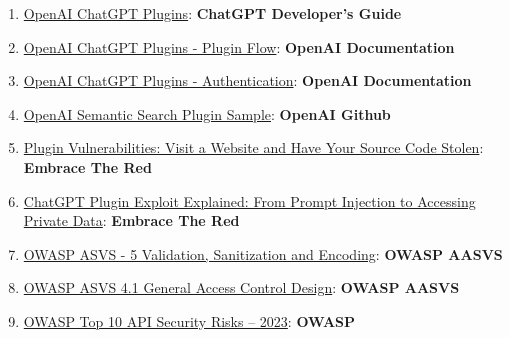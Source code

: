 \documentclass[
]{article}
\providecommand{\tightlist}{%
  \setlength{\itemsep}{0pt}\setlength{\parskip}{0pt}}
\begin{document}
\begin{enumerate}
\def\labelenumi{\arabic{enumi}.}
\tightlist
\item
  \href{https://platform.openai.com/docs/plugins/introduction}{OpenAI
  ChatGPT Plugins}: \textbf{ChatGPT Developer's Guide}
\item
  \href{https://platform.openai.com/docs/plugins/introduction/plugin-flow}{OpenAI
  ChatGPT Plugins - Plugin Flow}: \textbf{OpenAI Documentation}
\item
  \href{https://platform.openai.com/docs/plugins/authentication/service-level}{OpenAI
  ChatGPT Plugins - Authentication}: \textbf{OpenAI Documentation}
\item
  \href{https://github.com/openai/chatgpt-retrieval-plugin}{OpenAI
  Semantic Search Plugin Sample}: \textbf{OpenAI Github}
\item
  \href{https://embracethered.com/blog/posts/2023/chatgpt-plugin-vulns-chat-with-code/}{Plugin
  Vulnerabilities: Visit a Website and Have Your Source Code Stolen}:
  \textbf{Embrace The Red}
\item
  \href{https://embracethered.com/blog/posts/2023/chatgpt-cross-plugin-request-forgery-and-prompt-injection./}{ChatGPT
  Plugin Exploit Explained: From Prompt Injection to Accessing Private
  Data}: \textbf{Embrace The Red}
\item
  \href{https://owasp-aasvs4.readthedocs.io/en/latest/V5.html\#validation-sanitization-and-encoding}{OWASP
  ASVS - 5 Validation, Sanitization and Encoding}: \textbf{OWASP AASVS}
\item
  \href{https://owasp-aasvs4.readthedocs.io/en/latest/V4.1.html\#general-access-control-design}{OWASP
  ASVS 4.1 General Access Control Design}: \textbf{OWASP AASVS}
\item
  \href{https://owasp.org/API-Security/editions/2023/en/0x11-t10/}{OWASP
  Top 10 API Security Risks -- 2023}: \textbf{OWASP}
\end{enumerate}
\end{document}
